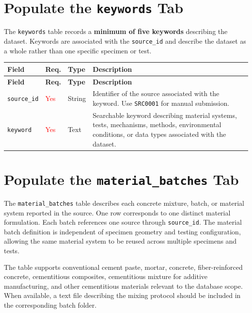 \documentclass[11pt]{book}
\begin{document}
\section{Populate the \texttt{keywords} Tab}

The \texttt{keywords} table records a \textbf{minimum of five keywords} describing the dataset. Keywords are associated with the \texttt{source\_id} and describe the dataset as a whole rather than one specific specimen or test.

\setlength{\tabcolsep}{4pt}

\begin{longtable}{p{}p{}p{}p{}}
\hline
\textbf{Field} & \textbf{Req.} & \textbf{Type} & \textbf{Description} \\
\hline
\endfirsthead

\hline
\textbf{Field} & \textbf{Req.} & \textbf{Type} & \textbf{Description} \\
\hline
\endhead

\hline
\endfoot

\texttt{source\_id} & \textcolor{red}{Yes} & String & Identifier of the source associated with the keyword. Use \texttt{SRC0001} for manual submission. \\

\texttt{keyword} & \textcolor{red}{Yes} & Text & Searchable keyword describing material systems, tests, mechanisms, methods, environmental conditions, or data types associated with the dataset. \\

\end{longtable}

\section{Populate the \texttt{material\_batches} Tab}

The \texttt{material\_batches} table describes each concrete mixture, batch, or material system reported in the source. One row corresponds to one distinct material formulation. Each batch references one source through \texttt{source\_id}. The material batch definition is independent of specimen geometry and testing configuration, allowing the same material system to be reused across multiple specimens and tests.

The table supports conventional cement paste, mortar, concrete, fiber-reinforced concrete, cementitious composites, cementitious mixture for additive manufacturing, and other cementitious materials relevant to the database scope. When available, a text file describing the mixing protocol should be included in the corresponding batch folder.
\end{document}
